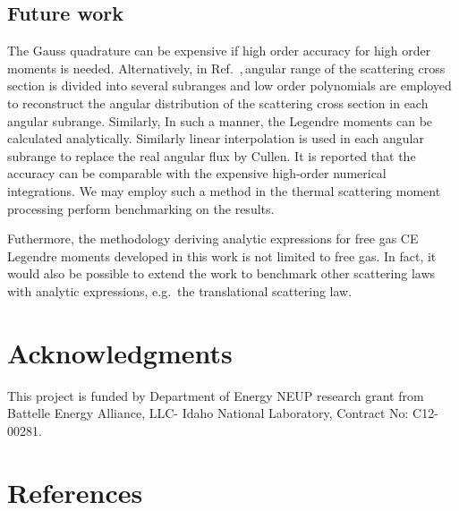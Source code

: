 \documentclass[review]{elsarticle}
\newcommand{\tcr}[1]{\textcolor{blue}{\textbf{#1}}}
\begin{document}
\subsection{Future work}
The Gauss quadrature can be expensive if high order accuracy for high order moments is needed. Alternatively, in Ref.\ \cite{transfercrosssection},\,angular range of the scattering cross section is divided into several subranges and low order polynomials are employed to reconstruct the angular distribution of the scattering cross section in each angular subrange. Similarly,  In such a manner, the Legendre moments can be calculated analytically. Similarly linear interpolation is used in each angular subrange to replace the real angular flux by Cullen\cite{handbookdataprepare,cullen2007a,cullen2007b}. It is reported that the accuracy can be comparable with the expensive high-order numerical integrations\cite{transfercrosssection}. We may employ such a method in the thermal scattering moment processing perform benchmarking on the results.


Futhermore, the methodology deriving analytic expressions for free gas CE Legendre moments developed in this work is not limited to free gas. In fact, it would also be possible to extend the work to benchmark other scattering laws with analytic expressions, e.g.~the translational scattering law\cite{NJOY}.

\section*{Acknowledgments}
This project is funded by Department of Energy NEUP research grant from Battelle Energy Alliance, LLC- Idaho National Laboratory, Contract No: C12-00281.

\section*{References}


\end{document}

